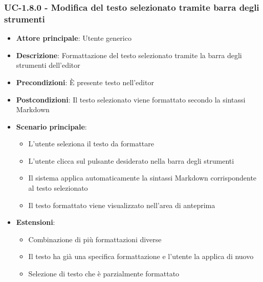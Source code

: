 \documentclass[11pt,a4paper]{article}
\begin{document}
\subsubsection{UC-1.8.0 - Modifica del testo selezionato tramite barra degli strumenti}
\begin{itemize}
    \item \textbf{Attore principale}: Utente generico
    \item \textbf{Descrizione}: Formattazione del testo selezionato tramite la barra degli strumenti dell'editor
    \item \textbf{Precondizioni}: È presente testo nell'editor
    \item \textbf{Postcondizioni}: Il testo selezionato viene formattato secondo la sintassi Markdown
    \item \textbf{Scenario principale}:
        \begin{itemize}
            \item L'utente seleziona il testo da formattare
            \item L'utente clicca sul pulsante desiderato nella barra degli strumenti
            \item Il sistema applica automaticamente la sintassi Markdown corrispondente al testo selezionato
            \item Il testo formattato viene visualizzato nell'area di anteprima
        \end{itemize}
    \item \textbf{Estensioni}:
        \begin{itemize}
            \item Combinazione di più formattazioni diverse
            \item Il testo ha già una specifica formattazione e l'utente la applica di nuovo
            \item Selezione di testo che è parzialmente formattato
        \end{itemize}
\end{itemize}
\end{document}
